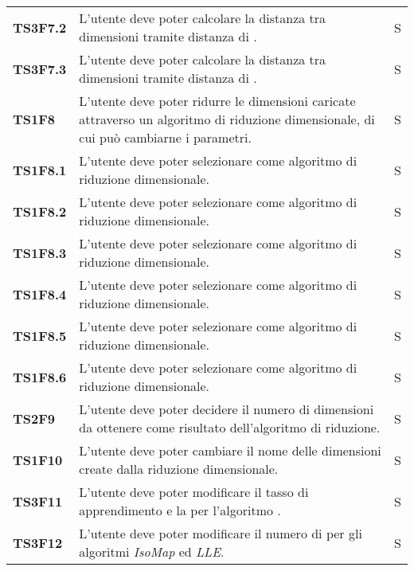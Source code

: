 {\begin{longtable}{ C{2cm} | C{12cm}| C{1.5cm} }
\textbf{TS3F7.2} & 
L'utente deve poter calcolare la distanza tra dimensioni tramite distanza di . & 
S\\

\textbf{TS3F7.3} & 
L'utente deve poter calcolare la distanza tra dimensioni tramite distanza di . & 
S\\

\textbf{TS1F8} & 
L'utente deve poter ridurre le dimensioni caricate attraverso un algoritmo di riduzione dimensionale, di cui può cambiarne i parametri. & 
S\\

\textbf{TS1F8.1} & 
L'utente deve poter selezionare  come algoritmo di riduzione dimensionale. & 
S\\

\textbf{TS1F8.2} & 
L'utente deve poter selezionare  come algoritmo di riduzione dimensionale. & 
S\\

\textbf{TS1F8.3} & 
L'utente deve poter selezionare  come algoritmo di riduzione dimensionale. & 
S\\

\textbf{TS1F8.4} & 
L'utente deve poter selezionare  come algoritmo di riduzione dimensionale. & 
S\\

\textbf{TS1F8.5} & 
L'utente deve poter selezionare  come algoritmo di riduzione dimensionale. & 
S\\

\textbf{TS1F8.6} & 
L'utente deve poter selezionare  come algoritmo di riduzione dimensionale. & 
S\\

\textbf{TS2F9} & 
L'utente deve poter decidere il numero di dimensioni da ottenere come risultato dell'algoritmo di riduzione. & 
S\\

\textbf{TS1F10} & 
L'utente deve poter cambiare il nome delle dimensioni create dalla riduzione dimensionale. & 
S\\

\textbf{TS3F11} & 
L'utente deve poter modificare il tasso di apprendimento e la  per l'algoritmo . & 
S\\

\textbf{TS3F12} & 
L'utente deve poter modificare il numero di  per gli algoritmi \textit{IsoMap} ed \textit{LLE}. & 
S\\


\end{longtable}}
